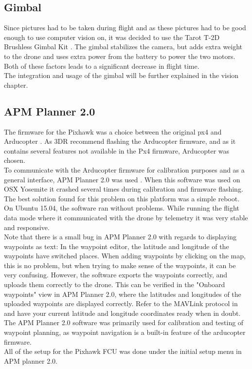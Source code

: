 \subsection*{Gimbal}
Since pictures had to be taken during flight and as these pictures had to be good enough to use
computer vision on, it was decided to use the Tarot T-2D Brushless Gimbal Kit \cite{Ref:Gimbal}. The
gimbal stabilizes the camera,
but adds extra weight to the drone and uses extra power from the battery to power the two
motors. Both of these factors leads to a significant decrease in flight time.\\
The integration and usage of the gimbal will be further explained in the vision chapter. 

\subsection*{APM Planner 2.0}
The firmware for the Pixhawk was a choice between the original px4 and Arducopter
\cite{Ref:Arducopter}. As 3DR recommend flashing the Arducopter firmware, and as it contains several
features not available in the Px4 firmware, Arducopter was chosen.\\
To communicate with the Arducopter firmware for calibration purposes and as a general interface,
APM Planner 2.0 was used \cite{Ref:APM2}.
When this software was used on OSX Yosemite it crashed several times
during calibration and firmware flashing. The best solution found for this problem on this platform
was a simple reboot. On Ubuntu 15.04, the software ran without problems.
While running the flight data mode where it communicated with the drone by
telemetry it was very stable and responsive.\\
Note that there is a small bug in APM Planner 2.0 with regards to displaying waypoints as text:
In the waypoint editor, the latitude and longitude of the waypoints have switched places. When adding
waypoints by clicking on the map, this is no problem, but when trying to make sense of the waypoints,
it can be very confusing. However, the software exports the waypoints correctly, and uploads them correctly to the drone.
This can be verified in the "Onboard waypoints" view in APM Planner 2.0, where the latitudes and longitudes of the uploaded
waypoints are displayed correctly.
Refer to the MAVLink protocol in \cite{Ref:MAVLink} and have your current latitude and longitude coordinates ready when in doubt.
The APM Planner 2.0 software was primarily used for calibration and testing of waypoint planning,
as waypoint navigation is a built-in feature of the arducopter firmware.\\
All of the setup for the Pixhawk FCU was done under the initial setup menu in APM planner 2.0.

